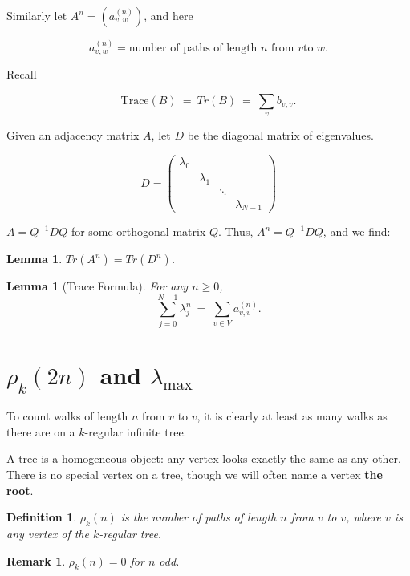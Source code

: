 \documentclass[12pt,letterpaper]{report}
\newcommand\be{\begin{equation}}
\newcommand\ee{\end{equation}}
\newcommand{\tbf}[1]{\textbf{#1}}
\newtheorem{lem}[thm]{Lemma}
\newtheorem{defi}[thm]{Definition}
\newtheorem{rek}[thm]{Remark}
\begin{document}
Similarly let $A^n = (a^{(n)}_{v,w})$, and here

\be a^{(n)}_{v,w} = \text{number of paths of length $n$ from $v$
to $w$}. \ee

Recall

\be \text{Trace}(B) \ = \ Tr(B) \ = \ \sum_v b_{v,v}. \ee

Given an adjacency matrix $A$, let $D$ be the diagonal matrix of
eigenvalues.

\be D = \left(\begin{array}{cccc}
                        \lambda_0  &   &   &     \\
                          & \lambda_1  &  &     \\
                         &   &  \ddots &     \\
                         &   &   &  \lambda_{N-1}
                          \end{array}\right)
\ee

$A = Q^{-1} D Q$ for some orthogonal matrix $Q$. Thus, $A^n =
Q^{-1} D Q$, and we find:

\begin{lem} $Tr(A^n) = Tr(D^n)$. \end{lem}

\begin{lem}[Trace Formula] For any $n \ge 0$,
\be \sum_{j=0}^{N-1} \lambda_j^n \ = \ \sum_{v \in V}
a^{(n)}_{v,v}. \ee \end{lem}



\section{$\rho_k(2n)$ and $\lambda_{\max}$}

To count walks of length $n$ from $v$ to $v$, it is clearly at
least as many walks as there are on a $k$-regular infinite tree.

A tree is a homogeneous object: any vertex looks exactly the same
as any other. There is no special vertex on a tree, though we will
often name a vertex \tbf{the root}.

\begin{defi} $\rho_k(n)$ is the number of paths of length $n$ from
$v$ to $v$, where $v$ is \emph{any} vertex of \emph{the}
$k$-regular tree. \end{defi}

\begin{rek} $\rho_k(n) = 0$ for $n$ odd. \end{rek}
\end{document}
